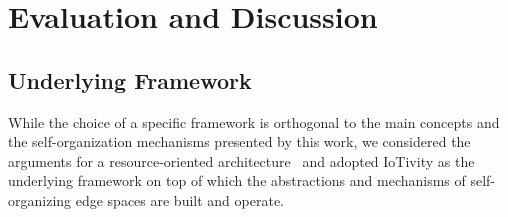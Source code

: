 \section{Evaluation and Discussion}\label{sec:evaluation}


\subsection{Underlying Framework}

While the choice of a specific framework is orthogonal to the main concepts and the self-organization mechanisms presented by this work, we considered the arguments for a resource-oriented architecture~\cite{PRIME} and adopted IoTivity as the underlying framework on top of which the abstractions and mechanisms of self-organizing edge spaces are built and operate.


